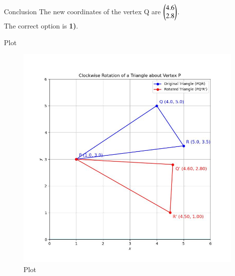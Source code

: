 \documentclass{beamer}
\begin{document}
\begin{frame}{Conclusion}
The new coordinates of the vertex Q are $\begin{pmatrix}4.6 \\ 2.8\end{pmatrix}$. \\
The correct option is \textbf{1)}.
\end{frame}

\begin{frame}{Plot}
\begin{figure}
	\centering
	\includegraphics[width=0.5\columnwidth]{../figs/plot_c.jpg}
	\caption{Plot}
	\label{fig:fig}
\end{figure}
\end{frame}
\end{document}
